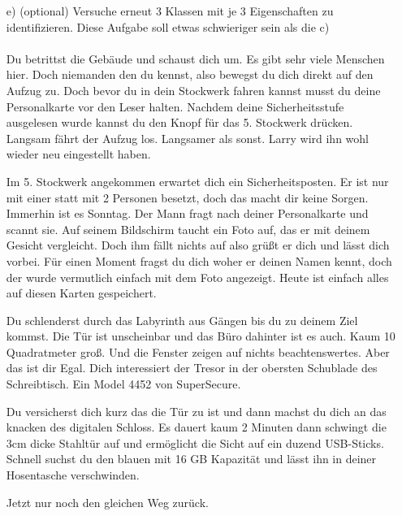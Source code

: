 \begin{enumerate}
\item[e)] (optional) Versuche erneut 3 Klassen mit je 3 Eigenschaften  zu identifizieren. Diese Aufgabe soll etwas schwieriger sein als die c)
\paragraph{}
Du betrittst die Gebäude und schaust dich um. Es gibt sehr viele Menschen hier. Doch niemanden den du kennst, also bewegst du dich direkt auf den Aufzug zu. Doch bevor du in dein Stockwerk fahren kannst musst du deine Personalkarte vor den Leser halten. Nachdem deine Sicherheitsstufe ausgelesen wurde kannst du den Knopf für das 5. Stockwerk drücken. Langsam fährt der Aufzug los. Langsamer als sonst. Larry wird ihn wohl wieder neu eingestellt haben.

Im 5. Stockwerk angekommen erwartet dich ein Sicherheitsposten. Er ist nur mit einer statt mit 2 Personen besetzt, doch das macht dir keine Sorgen. Immerhin ist es Sonntag. Der Mann fragt nach deiner Personalkarte und scannt sie. Auf seinem Bildschirm taucht ein Foto auf, das er mit deinem Gesicht vergleicht. Doch ihm fällt nichts auf also grüßt er dich und lässt dich vorbei. Für einen Moment fragst du dich woher er deinen Namen kennt, doch der wurde vermutlich einfach mit dem Foto angezeigt. Heute ist einfach alles auf diesen Karten gespeichert.

Du schlenderst durch das Labyrinth aus Gängen bis du zu deinem Ziel kommst. Die Tür ist unscheinbar und das Büro dahinter ist es auch. Kaum 10 Quadratmeter groß. Und die Fenster zeigen auf nichts beachtenswertes. Aber das ist dir Egal. Dich interessiert der Tresor in der obersten Schublade des Schreibtisch. Ein Model 4452 von SuperSecure.

Du versicherst dich kurz das die Tür zu ist und dann machst du dich an das knacken des digitalen Schloss. Es dauert kaum 2 Minuten dann schwingt die 3cm dicke Stahltür auf und ermöglicht die Sicht auf ein duzend USB-Sticks. Schnell suchst du den blauen mit 16 GB Kapazität und lässt ihn in deiner Hosentasche verschwinden.

Jetzt nur noch den gleichen Weg zurück.
\end{enumerate}
